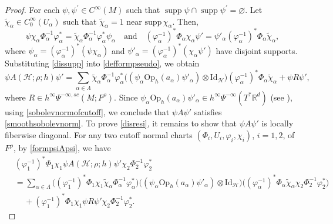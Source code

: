 \documentclass[11pt,oneside,reqno]{amsart}
\newcommand\R{\ensuremath{\mathbb{R}}}
\newcommand\Oph{\ensuremath{\mathrm{Op}_h}}
\theoremstyle{definition}
\numberwithin{equation}{section}
\theoremstyle{plain}
\begin{document}
\begin{proof}
For each $\psi, \psi^{\prime} \in C^{\infty}(M)$ such that $\operatorname{supp} \psi \cap \operatorname{supp} \psi^{\prime}=\varnothing$. Let $\widetilde{\chi}_\alpha \in C_0^\infty(U_\alpha) $ such that $\widetilde{\chi}_\alpha =1$ near $\mathrm{supp}\, \chi_\alpha$. Then,  
\begin{equation}\label{dissupp}
    \psi\chi_{\alpha}\Phi_{\alpha}^{-1} \varphi_{\alpha}^*=\widetilde{\chi}_{\alpha}\Phi_{\alpha}^{-1} \varphi_{\alpha}^* \psi_\alpha \quad \mathrm{and} \quad  (\varphi_{\alpha}^{-1})^* \Phi_{\alpha}\chi_{\alpha} \psi' = \psi'_\alpha (\varphi_{\alpha}^{-1})^* \Phi_{\alpha} \widetilde{\chi}_{\alpha},
\end{equation}
where $\psi_\alpha  = (\varphi_{\alpha}^{-1})^*  (\psi \chi_\alpha )$ and $\psi'_\alpha  = (\varphi_{\alpha}^{-1})^*  (\chi_\alpha \psi')$ have disjoint supports. Substituting \eqref{dissupp} into \eqref{defformpseudo}, we obtain
\begin{equation}\label{formpsiApsi}
    \psi A(\mathcal{H};\rho;h)\psi' = \sum_{\alpha\in \Lambda} \widetilde{\chi}_{\alpha}\Phi_{\alpha}^{-1} \varphi_{\alpha}^* 
        \big( (\psi_\alpha \Oph(a_{\alpha} )\psi'_\alpha) \otimes \mathrm{Id}_{\mathcal{H}} \big)
        (\varphi_{\alpha}^{-1})^* \Phi_{\alpha} \widetilde{\chi}_{\alpha} + \psi R\psi',
\end{equation}
where $R \in h^{\infty}\Psi^{-\infty,sc}(M;F^\rho)$. Since $\psi_\alpha \Oph(a_{\alpha} )\psi'_\alpha \in h^\infty \Psi^{-\infty}(T^*\R^d) $ (see \cite[Proposition E.13]{dyatlovzworski2019resonances}), using \eqref{sobolevnormofcutoff}, we conclude that $\psi A \psi'$ satisfies \eqref{smoothsobolevnorm}. To prove \eqref{disresi}, it remains to show that $\psi A \psi'$ is locally fiberwise diagonal. For any two cutoff normal charts $(\Phi_i,U_i,\varphi_i,\chi_i)$, $i=1,2$, of $F^\rho$, by \eqref{formpsiApsi}, we have
\begin{equation}\label{LFDveri}
    \begin{aligned}
       & (\varphi^{-1}_1)^{*}\Phi_1\chi_1 \psi A(\mathcal{H};\rho;h) \psi '\chi_2\Phi^{-1}_2\varphi^{*}_2 \\
&= \sum_{\alpha\in \Lambda} \Big( (\varphi^{-1}_1)^{*}\Phi_1\chi_1\widetilde{\chi}_{\alpha}\Phi_{\alpha}^{-1} \varphi_{\alpha}^* \Big)
        \Big( (\psi_\alpha \Oph(a_{\alpha} )\psi'_\alpha) \otimes \mathrm{Id}_{\mathcal{H}} \Big)
        \Big(  (\varphi_{\alpha}^{-1})^* \Phi_{\alpha} \widetilde{\chi}_{\alpha} \chi_2\Phi^{-1}_2\varphi^{*}_2 \Big)  \\
        &\quad\, + (\varphi^{-1}_1)^{*}\Phi_1\chi_1\psi R\psi' \chi_2\Phi^{-1}_2\varphi^{*}_2.

\end{aligned}
\end{equation}
\end{proof}
\end{document}
